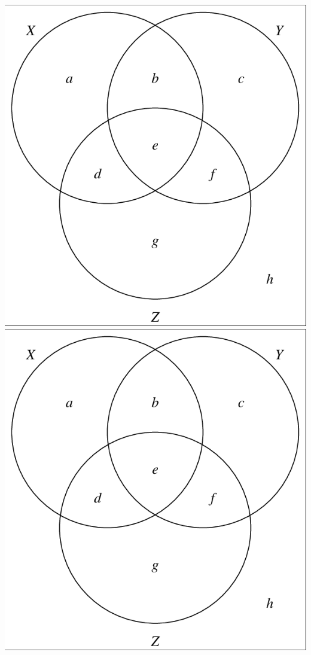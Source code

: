 \begin{center}
\includegraphics[scale=0.3]{img/Venn-diagram-visualization-of-a-3-event-probability-space-O.png}
\includegraphics[scale=0.3]{img/Venn-diagram-visualization-of-a-3-event-probability-space-O.png}
\end{center}

